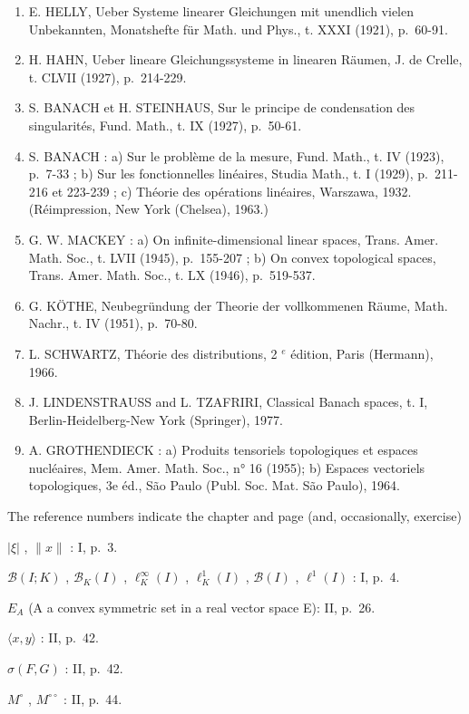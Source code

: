 \begin{enumerate}
\item
  E. HELLY, Ueber Systeme linearer Gleichungen mit unendlich vielen Unbekannten, Monatshefte für Math. und Phys., t. XXXI (1921), p.~60-91.
\item
  H. HAHN, Ueber lineare Gleichungssysteme in linearen Räumen, J. de Crelle, t. CLVII (1927), p.~214-229.
\item
  S. BANACH et H. STEINHAUS, Sur le principe de condensation des singularités, Fund. Math., t. IX (1927), p.~50-61.
\item
  S. BANACH : a) Sur le problème de la mesure, Fund. Math., t. IV (1923), p.~7-33 ; b) Sur les fonctionnelles linéaires, Studia Math., t. I (1929), p.~211-216 et 223-239 ; c) Théorie des opérations linéaires, Warszawa, 1932. (Réimpression, New York (Chelsea), 1963.)
\item
  G. W. MACKEY : a) On infinite-dimensional linear spaces, Trans. Amer. Math. Soc., t. LVII (1945), p.~155-207 ; b) On convex topological spaces, Trans. Amer. Math. Soc., t. LX (1946), p.~519-537.
\item
  G. KÖTHE, Neubegründung der Theorie der vollkommenen Räume, Math. Nachr., t. IV (1951), p.~70-80.
\item
  L. SCHWARTZ, Théorie des distributions, 2 \(^{e}\) édition, Paris (Hermann), 1966.
\item
  J. LINDENSTRAUSS and L. TZAFRIRI, Classical Banach spaces, t. I, Berlin-Heidelberg-New York (Springer), 1977.
\item
  A. GROTHENDIECK : a) Produits tensoriels topologiques et espaces nucléaires, Mem. Amer. Math. Soc., n° 16 (1955); b) Espaces vectoriels topologiques, 3e éd., São Paulo (Publ. Soc. Mat. São Paulo), 1964.
\end{enumerate}


The reference numbers indicate the chapter and page (and, occasionally, exercise)

\(|\xi|\) , \(\|x\|\) : I, p.~3.

\(\mathcal{B}(I; K)\) , \(\mathcal{B}_{K}(I)\) , \(\ell_{K}^{\infty}(I)\) , \(\ell_{K}^{1}(I)\) , \(\mathcal{B}(I)\) , \(\ell^{1}(I)\) : I, p.~4.

\(E_{A}\) (A a convex symmetric set in a real vector space E): II, p.~26.

\(\langle x, y \rangle\) : II, p.~42.

\(\sigma(F, G)\) : II, p.~42.

\(M^{\circ}\) , \(M^{\circ\circ}\) : II, p.~44.

